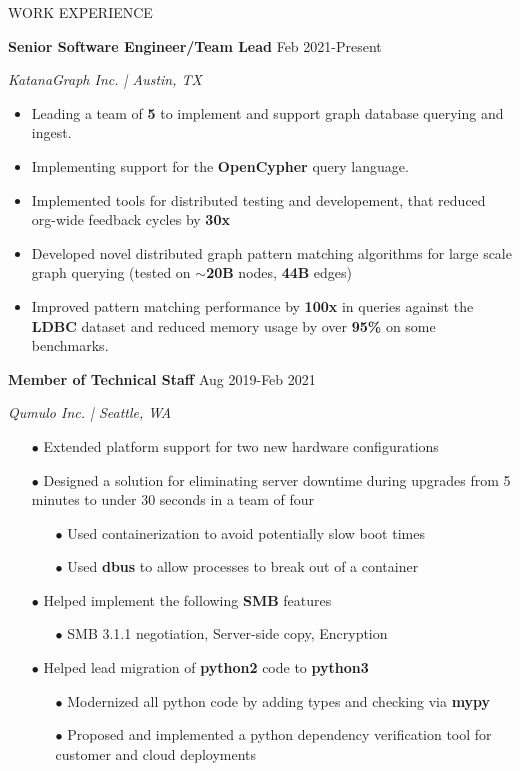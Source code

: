 \documentclass[paper=a4,fontsize=11pt]{scrartcl} %
\newcommand{\sepspace}{\vspace*{1em}}		%
\newcommand{\NewPart}[1]{ \noindent \large \usefont{OT1}{phv}{b}{n}\uppercase{#1} \normalfont \normalsize}
\newcommand{\EducationEntry}[4]{
		\noindent \textbf{#1}     %
			\hfill#2 \par  %
		\noindent \textit{#3} \par        %
		\noindent\hangafter=0 \small #4 %
		\normalsize \par}
\begin{document}
\hspace{-1.5em}
\begin{minipage}[t]{0.78\textwidth}
\sepspace

\vspace{-1.5em}
\NewPart{Work experience}{}

\EducationEntry{Senior Software Engineer/Team Lead}{Feb 2021-Present}{KatanaGraph Inc. | Austin, TX}{
\begin{itemize}
  \item Leading a team of \textbf{5} to implement and support graph database querying and ingest.
  \item Implementing support for the \textbf{OpenCypher} query language.
  \item Implemented tools for distributed testing and developement, that reduced org-wide feedback cycles by \textbf{30x}
  \item Developed novel distributed graph pattern matching algorithms for large scale graph querying (tested on $\sim$\textbf{20B} nodes, \textbf{44B} edges)
  \item Improved pattern matching performance by \textbf{100x} in queries against the \textbf{LDBC} dataset and reduced memory usage by over \textbf{95\%} on some benchmarks.
\end{itemize}
}

\EducationEntry{Member of Technical Staff}{Aug 2019-Feb 2021}{Qumulo Inc. | Seattle, WA}{
\begin{itemize}
  \item[$\bullet$] Extended platform support for two new hardware configurations
  \item[$\bullet$] Designed a solution for eliminating server downtime during upgrades from 5 minutes to under 30 seconds in a team of four
    \begin{itemize}
        \item[$\bullet$] Used containerization to avoid potentially slow boot times
        \item[$\bullet$] Used \textbf{dbus} to allow processes to break out of a container
    \end{itemize}
  \item[$\bullet$] Helped implement the following \textbf{SMB} features
    \begin{itemize}
      \item[$\bullet$] SMB 3.1.1 negotiation, Server-side copy, Encryption
    \end{itemize}
  \item[$\bullet$] Helped lead migration of \textbf{python2} code to \textbf{python3}
    \begin{itemize}
      \item[$\bullet$] Modernized all python code by adding types and checking via \textbf{mypy}
      \item[$\bullet$] Proposed and implemented a python dependency verification tool for customer and cloud deployments
    \end{itemize}
\end{itemize}
}


\end{minipage}
\end{document}
